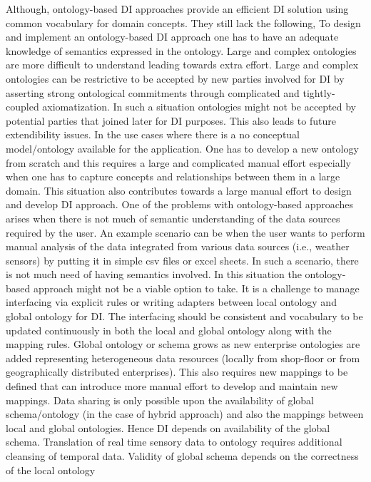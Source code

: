 Although, ontology-based DI approaches provide an efficient DI solution using common vocabulary for domain concepts. They still lack the following,
To design and implement an ontology-based DI approach one has to have an adequate knowledge of semantics expressed in the ontology. Large and complex ontologies are more difficult to understand leading towards extra effort.
Large and complex ontologies can be restrictive to be accepted by new parties involved for DI by asserting strong ontological commitments through complicated and tightly-coupled axiomatization. In such a situation ontologies might not be accepted by potential parties that joined later for DI purposes. This also leads to future extendibility issues.
In the use cases where there is a no conceptual model/ontology available for the application. One has to develop a new ontology from scratch and this requires a large and complicated manual effort especially when one has to capture concepts and relationships between them in a large domain. This situation also contributes towards a large manual effort to design and develop DI approach.
One of the problems with ontology-based approaches arises when there is not much of semantic understanding of the data sources required by the user. An example scenario can be when the user wants to perform manual analysis of the data integrated from various data sources (i.e., weather sensors) by putting it in simple csv files or excel sheets. In such a scenario, there is not much need of having semantics involved. In this situation the ontology-based approach might not be a viable option to take.
It is a challenge to manage interfacing via explicit rules or writing adapters between local ontology and global ontology for DI. The interfacing should be consistent and vocabulary to be updated continuously in both the local and global ontology along with the mapping rules.
Global ontology or schema grows as new enterprise ontologies are added representing heterogeneous data resources (locally from shop-floor or from geographically distributed enterprises). This also requires new mappings to be defined that can introduce more manual effort to develop and maintain new mappings.
Data sharing is only possible upon the availability of global schema/ontology (in the case of hybrid approach) and also the mappings between local and global ontologies. Hence DI depends on availability of the global schema.
Translation of real time sensory data to ontology requires additional cleansing of temporal data. Validity of global schema depends on the correctness of the local ontology
